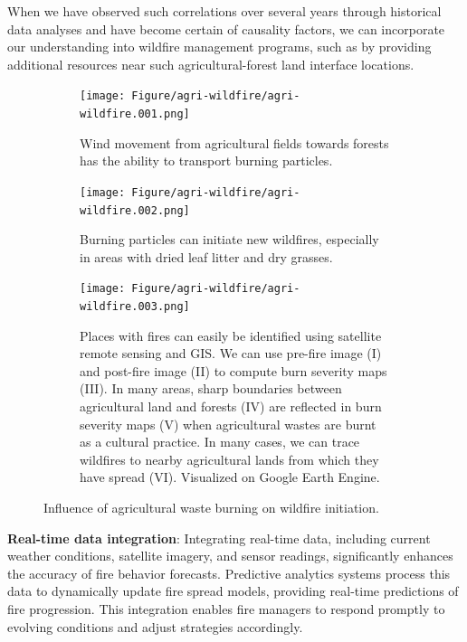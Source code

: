\documentclass[
  12 pt,
]{Nemilov}
\begin{document}
When we have observed such correlations over several years through historical data analyses and have become certain of causality factors, we can incorporate our understanding into wildfire management programs, such as by providing additional resources near such agricultural-forest land interface locations.

\begin{figure}[htp]
    \centering
    \begin{subfigure}[b]{0.45\textwidth}
           \centering
           \texttt{[image: Figure/agri-wildfire/agri-wildfire.001.png]}
            \caption{Wind movement from agricultural fields towards forests has the ability to transport burning particles.}
            
    \end{subfigure}    
\hfill    
    \begin{subfigure}[b]{0.45\textwidth}
            \centering
            \texttt{[image: Figure/agri-wildfire/agri-wildfire.002.png]}
            \caption{Burning particles can initiate new wildfires, especially in areas with dried leaf litter and dry grasses.}
            
    \end{subfigure}     

\vfill
    \begin{subfigure}[b]{\textwidth}
           \centering
           \texttt{[image: Figure/agri-wildfire/agri-wildfire.003.png]}
            \caption{Places with fires can easily be identified using satellite remote sensing and GIS. We can use pre-fire image (I) and post-fire image (II) to compute burn severity maps (III). In many areas, sharp boundaries between agricultural land and forests (IV) are reflected in burn severity maps (V) when agricultural wastes are burnt as a cultural practice. In many cases, we can trace wildfires to nearby agricultural lands from which they have spread (VI). Visualized on Google Earth Engine.}
            
    \end{subfigure}    
    
    \caption{Influence of agricultural waste burning on wildfire initiation.
\label{AgriWildfire}}
\end{figure}

\textbf{Real-time data integration}: Integrating real-time data, including current weather conditions, satellite imagery, and sensor readings, significantly enhances the accuracy of fire behavior forecasts. Predictive analytics systems process this data to dynamically update fire spread models, providing real-time predictions of fire progression. This integration enables fire managers to respond promptly to evolving conditions and adjust strategies accordingly.
\end{document}
